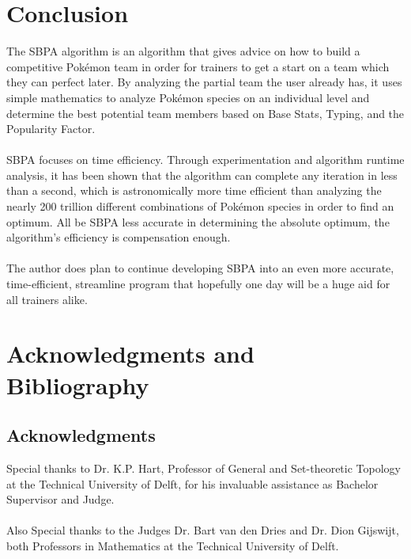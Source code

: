 \documentclass{article}
\begin{document}
\section{Conclusion}
The SBPA algorithm is an algorithm that gives advice on how to build a competitive Pok\'emon team in order for trainers to get a start on a team which they can perfect later. By analyzing the partial team the user already has, it uses simple mathematics to analyze Pok\'emon species on an individual level and determine the best potential team members based on Base Stats, Typing, and the Popularity Factor.\\\\
SBPA focuses on time efficiency. Through experimentation and algorithm runtime analysis, it has been shown that the algorithm can complete any iteration in less than a second, which is astronomically more time efficient than analyzing the nearly 200 trillion different combinations of Pok\'emon species in order to find an optimum. All be SBPA less accurate in determining the absolute optimum, the algorithm's efficiency is compensation enough.\\\\
The author does plan to continue developing SBPA into an even more accurate, time-efficient, streamline program that hopefully one day will be a huge aid for all trainers alike.

\newpage
\section{Acknowledgments and Bibliography}
\subsection{Acknowledgments}
Special thanks to Dr. K.P. Hart, Professor of General and Set-theoretic Topology at the Technical University of Delft, for his invaluable assistance as Bachelor Supervisor and Judge.\\\\
Also Special thanks to the Judges Dr. Bart van den Dries and Dr. Dion Gijswijt, both Professors in Mathematics at the Technical University of Delft.
\end{document}
